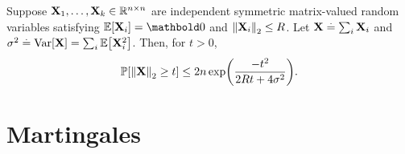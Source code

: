 \begin{thm} Suppose $\mathbf{X}_1, \dots, \mathbf{X}_k \in \mathbb{R}^{n \times n}$ are independent symmetric matrix-valued random variables satisfying $\E{\rX_i} = \mZero$ and $\left\| \mathbf{X}_i \right\|_2 \leq R$. Let $\mathbf{X} \overset{.}{=} \sum_i \mathbf{X}_i$ and $\sigma^2 \defeq \Var{\rX} = \sum_i \E{\rX_i^2}$. Then, for $t > 0$, \begin{align}
    \Pr{\norm{\rX}_2 \geq t} \leq 2 n \exp\parentheses*{\frac{-t^2}{2Rt + 4\sigma^2}}.
\end{align}
\end{thm}

\section{Martingales}